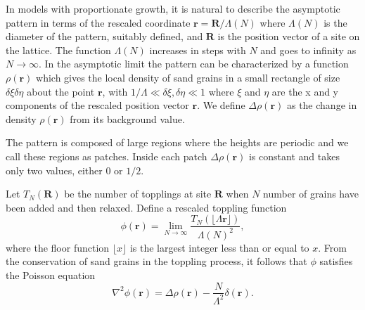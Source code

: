 \documentclass[11pt,a4paper]{book}
\begin{document}
In models with proportionate growth, it is natural to describe the
asymptotic pattern in terms of the rescaled coordinate
$\mathbf{r}=\mathbf{R}/\Lambda\left( N \right)$ where $\Lambda\left( N
\right)$ is the diameter of the pattern, suitably
defined, and $\mathbf{R}$ is the position vector of a site on the
lattice. The function $\Lambda\left( N \right)$ increases in steps
with $N$ and goes to infinity as $N\rightarrow\infty$. In the
asymptotic limit the pattern can be characterized by a function
$\rho\left( \mathbf{r} \right)$ which gives the local density of sand
grains in a small rectangle of size $\delta\xi\delta\eta$ about the
point $\mathbf{r}$, with $1/\Lambda \ll \delta\xi, \delta\eta\ll 1$
where $\xi$ and $\eta$ are the x and y components of the rescaled
position vector $\mathbf{r}$. We define $\Delta\rho\left(
\mathbf{r}\right)$ as the change in density $\rho\left(
\mathbf{r}\right)$ from its background value. 

The pattern is composed of large regions where the heights are
periodic and we call these regions as patches. Inside each patch
$\Delta\rho\left( \mathbf{r} \right)$ is constant and takes only two
values, either $0$ or $1/2$.

Let $T_{N}\left( \mathbf{R} \right)$ be the number of
topplings at site $\mathbf{R}$ when $N$ number of grains have been
added and then relaxed. Define a rescaled toppling function
\begin{equation}
\phi\left( \mathbf{r}
\right)=\lim_{N\rightarrow\infty}\frac{T_{N}\left(\lfloor\Lambda\mathbf{r}\rfloor
\right)}{\Lambda\left( N \right)^{2}},
\end{equation}
where the floor function $\lfloor x \rfloor$ is the largest integer less than or equal to $x$.
From the conservation of sand grains in the toppling process, it
follows that $\phi$ satisfies the Poisson equation
\begin{equation}
\nabla^{2}\phi\left( \mathbf{r} \right)=\Delta\rho\left(
\mathbf{r}\right)-\frac{N}{\Lambda^2}\delta\left( \mathbf{r} \right).
\label{eq:poisson}
\end{equation}
\end{document}
